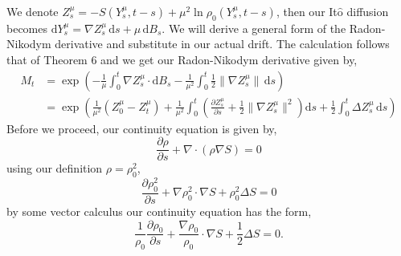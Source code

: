 \documentclass[a4paper,12pt,draft]{report}
\theoremstyle{remark}
\theoremstyle{definition}
\begin{document}
{
We denote $Z_s^\mu = -S(Y_s^\mu, t - s) + \mu^2\ln\rho_0(Y_s^\mu, t - s)$, then our It$\mathrm{\hat{o}}$ diffusion becomes $\mathrm{d}Y_s^\mu = \nabla Z_s^\mu\,\mathrm{d}s + \mu\,\mathrm{d}B_s$.  We will derive a general form of the Radon-Nikodym derivative and substitute in our actual drift.  The calculation follows that of Theorem 6 and we get our Radon-Nikodym derivative given by,
\begin{align}
M_t & = \exp\left(-\frac{1}{\mu}\int_0^t\nabla Z_s^\mu\cdot\mathrm{d}B_s - \frac{1}{\mu^2}\int_0^t\frac{1}{2}\|\nabla Z_s^\mu\|\,\mathrm{d}s\right)\nonumber\\
& = \exp\left(\frac{1}{\mu^2}(Z_0^\mu - Z_t^\mu) + \frac{1}{\mu^2}\int_0^t\left(\frac{\partial Z_s^\mu}{\partial s} + \frac{1}{2}\|\nabla Z_s^\mu\|^2\right)\mathrm{d}s + \frac{1}{2}\int_0^t\Delta Z_s^\mu\,\mathrm{d}s\right)\nonumber
\end{align}
Before we proceed, our continuity equation is given by,
$$
\frac{\partial \rho}{\partial s} + \nabla\cdot(\rho\nabla S) = 0
$$
using our definition $\rho = \rho_0^2$,
$$
\frac{\partial \rho_0^2}{\partial s} + \nabla\rho_0^2\cdot\nabla S + \rho_0^2\Delta S = 0
$$
by some vector calculus our continuity equation has the form,
$$
\frac{1}{\rho_0}\frac{\partial\rho_0}{\partial s} + \frac{\nabla\rho_0}{\rho_0}\cdot\nabla S + \frac{1}{2}\Delta S = 0.
$$

}
\end{document}
